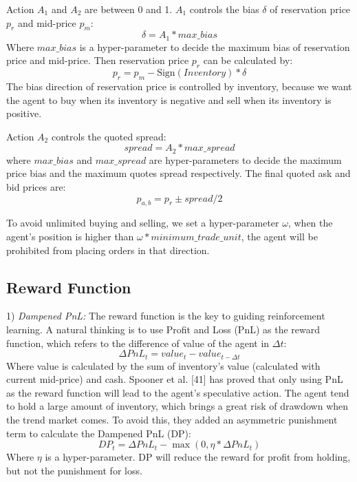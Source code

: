 \documentclass[conference]{IEEEtran}
\begin{document}
Action $A_1$ and $A_2$ are between 0 and 1. $A_1$ controls the bias $\delta$ of reservation price $p_r$ and mid-price $p_m$:
\begin{equation}
\delta = A_1 * max\_bias \tag{8}
\end{equation}
Where $max\_bias$ is a hyper-parameter to decide the maximum bias of reservation price and mid-price. Then reservation price $p_r$ can be calculated by:
\begin{equation}
p_r = p_m - \text{Sign}(Inventory) * \delta \tag{9}
\end{equation}
The bias direction of reservation price is controlled by inventory, because we want the agent to buy when its inventory is negative and sell when its inventory is positive.

Action $A_2$ controls the quoted spread:
\begin{equation}
spread = A_2 * max\_spread \tag{10}
\end{equation}
where $max\_bias$ and $max\_spread$ are hyper-parameters to decide the maximum price bias and the maximum quotes spread respectively. The final quoted ask and bid prices are:
\begin{equation}
p_{a,b} = p_r \pm spread/2 \tag{11}
\end{equation}

To avoid unlimited buying and selling, we set a hyper-parameter $\omega$, when the agent's position is higher than $\omega * minimum\_trade\_unit$, the agent will be prohibited from placing orders in that direction.

\subsection{Reward Function}
1) \textit{Dampened PnL:} The reward function is the key to guiding reinforcement learning. A natural thinking is to use Profit and Loss (PnL) as the reward function, which refers to the difference of value of the agent in $\Delta t$:
\begin{equation}
\Delta PnL_t = value_t - value_{t-\Delta t} \tag{12}
\end{equation}
Where value is calculated by the sum of inventory's value (calculated with current mid-price) and cash. Spooner et al. [41] has proved that only using PnL as the reward function will lead to the agent's speculative action. The agent tend to hold a large amount of inventory, which brings a great risk of drawdown when the trend market comes. To avoid this, they added an asymmetric punishment term to calculate the Dampened PnL (DP):
\begin{equation}
DP_t = \Delta PnL_t - \max(0, \eta * \Delta PnL_t) \tag{13}
\end{equation}
Where $\eta$ is a hyper-parameter. DP will reduce the reward for profit from holding, but not the punishment for loss.
\end{document}
